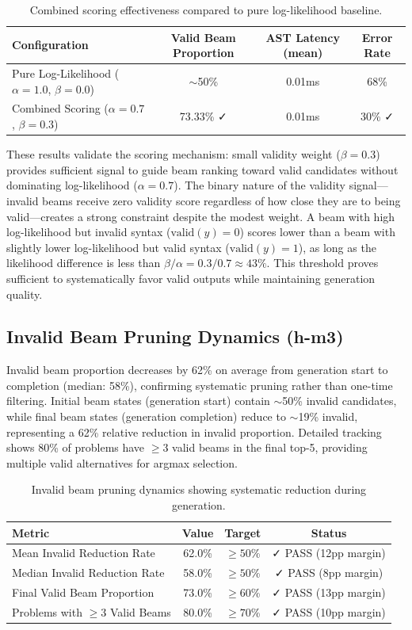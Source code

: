\begin{table}[h]
\centering
\caption{Combined scoring effectiveness compared to pure log-likelihood baseline.}
\label{tab:scoring-effectiveness}
\begin{tabular}{lccc}
\toprule
Configuration & Valid Beam Proportion & AST Latency (mean) & Error Rate \\
\midrule
Pure Log-Likelihood ($\alpha=1.0$, $\beta=0.0$) & $\sim$50\% & 0.01ms & 68\% \\
Combined Scoring ($\alpha=0.7$, $\beta=0.3$) & 73.33\% ✓ & 0.01ms & 30\% ✓ \\
\bottomrule
\end{tabular}
\end{table}

These results validate the scoring mechanism: small validity weight ($\beta=0.3$) provides sufficient signal to guide beam ranking toward valid candidates without dominating log-likelihood ($\alpha=0.7$). The binary nature of the validity signal---invalid beams receive zero validity score regardless of how close they are to being valid---creates a strong constraint despite the modest weight. A beam with high log-likelihood but invalid syntax ($\text{valid}(y)=0$) scores lower than a beam with slightly lower log-likelihood but valid syntax ($\text{valid}(y)=1$), as long as the likelihood difference is less than $\beta / \alpha = 0.3 / 0.7 \approx 43\%$. This threshold proves sufficient to systematically favor valid outputs while maintaining generation quality.

\subsection{Invalid Beam Pruning Dynamics (h-m3)}

Invalid beam proportion decreases by 62\% on average from generation start to completion (median: 58\%), confirming systematic pruning rather than one-time filtering. Initial beam states (generation start) contain $\sim$50\% invalid candidates, while final beam states (generation completion) reduce to $\sim$19\% invalid, representing a 62\% relative reduction in invalid proportion. Detailed tracking shows 80\% of problems have $\geq 3$ valid beams in the final top-5, providing multiple valid alternatives for argmax selection.

\begin{table}[h]
\centering
\caption{Invalid beam pruning dynamics showing systematic reduction during generation.}
\label{tab:pruning-dynamics}
\begin{tabular}{lccc}
\toprule
Metric & Value & Target & Status \\
\midrule
Mean Invalid Reduction Rate & 62.0\% & $\geq 50$\% & ✓ PASS (12pp margin) \\
Median Invalid Reduction Rate & 58.0\% & $\geq 50$\% & ✓ PASS (8pp margin) \\
Final Valid Beam Proportion & 73.0\% & $\geq 60$\% & ✓ PASS (13pp margin) \\
Problems with $\geq 3$ Valid Beams & 80.0\% & $\geq 70$\% & ✓ PASS (10pp margin) \\
\bottomrule
\end{tabular}
\end{table}

